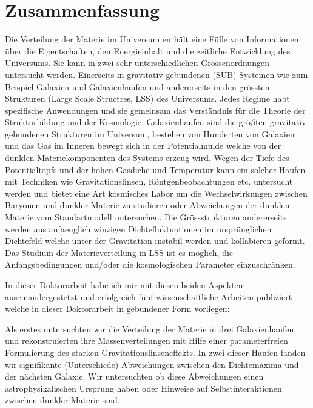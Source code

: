 {}

\chapter*{Zusammenfassung}%



Die Verteilung der Materie im Universum enth{\"a}lt eine F{\"u}lle von
Informationen {\"u}ber die Eigentschaften, den Energieinhalt und die zeitliche
Entwicklung des Universums. Sie kann in zwei sehr unterschiedlichen
Gr{\"o}ssenordnungen untersucht werden. Einerseits in gravitativ gebundenen
(SUB) Systemen wie zum Beispiel Galaxien und Galaxienhaufen und andererseits in
den gr{\"o}ssten  Strukturen (Large Scale Structres, LSS) des Universums.
Jedes Regime habt spezifische Anwendungen und sie gemeinsam das Verst{\"a}ndnis
f{\"u}r die Theorie der Strukturbildung und der Kosmologie.
Galaxienhaufen sind die gr{\"o}$\beta$ten gravitativ gebundenen Strukturen im
Universum, bestehen von Hunderten von Galaxien und das Gas im Inneren bewegt
sich in der Potentialmulde welche von der dunklen Materiekomponenten des Systems
erzeug wird. Wegen der Tiefe des Potentialtopfs und der hohen Gasdiche und
Temperatur kann ein solcher Haufen mit Techniken wie Gravitationslinsen,
R{\"o}ntgenbeobachtungen etc. untersucht werden und bietet eine Art kosmisches
Labor um  die Wechselwirkungen zwischen Baryonen und dunkler Materie zu
studieren oder Abweichungen der dunklen Materie vom Standartmodell untersuchen.
Die Gr{\"o}ssstrukturen andererseits werden aus anfaenglich winzigen
Dichtefluktuationen im urspr{\"u}nglichen Dichtefeld welche unter der
Gravitation instabil werden und kollabieren geformt. Das Studium der
Materieverteilung in LSS ist es m{\"o}glich, die Anfangsbedingungen und/oder
die kosmologischen Parameter einzuschr{\"a}nken.


In dieser Doktorarbeit habe ich mir mit diesen beiden Aspekten
auseinandergestetzt und erfolgreich f{\"u}nf wissenschaftliche Arbeiten
publiziert welche in dieser Doktorarbeit in gebundener Form vorliegen:

Als erstes untersuchten wir die Verteilung der Materie in drei Galaxienhaufen
und rekonstruierten ihre Massenverteilungen mit Hilfe einer parameterfreien
Formulierung des starken Gravitationslinseneffekts. In zwei dieser Haufen fanden
wir signifikante (Unterschiede) Abweichungen zwischen den Dichtemaxima und der
n{\"a}chsten Galaxie. Wir untersuchten ob diese Abweichungen einen
astrophysikalischen Ursprung haben oder Hinweise auf Selbstinteraktionen
zwischen dunkler Materie sind.

